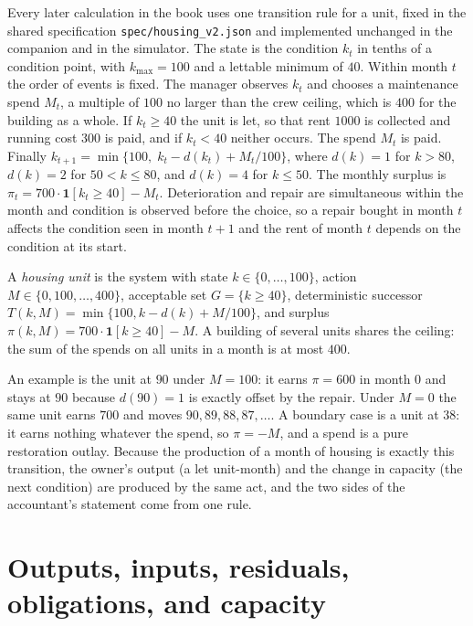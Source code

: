 Every later calculation in the book uses one transition rule for a unit, fixed in the shared specification \texttt{spec/housing\_v2.json} and implemented unchanged in the companion and in the simulator. The state is the condition $k_t$ in tenths of a condition point, with $k_{\max}=100$ and a lettable minimum of $40$. Within month $t$ the order of events is fixed. The manager observes $k_t$ and chooses a maintenance spend $M_t$, a multiple of $100$ no larger than the crew ceiling, which is $400$ for the building as a whole. If $k_t\ge 40$ the unit is let, so that rent $1000$ is collected and running cost $300$ is paid, and if $k_t<40$ neither occurs. The spend $M_t$ is paid. Finally $k_{t+1}=\min\{100,\;k_t-d(k_t)+M_t/100\}$, where $d(k)=1$ for $k>80$, $d(k)=2$ for $50<k\le 80$, and $d(k)=4$ for $k\le 50$. The monthly surplus is $\pi_t=700\cdot\mathbf 1[k_t\ge 40]-M_t$. Deterioration and repair are simultaneous within the month and condition is observed before the choice, so a repair bought in month $t$ affects the condition seen in month $t+1$ and the rent of month $t$ depends on the condition at its start.

\begin{definition}\label{def:housing-transition}
A \emph{housing unit} is the system with state $k\in\{0,\dots,100\}$, action $M\in\{0,100,\dots,400\}$, acceptable set $G=\{k\ge 40\}$, deterministic successor $T(k,M)=\min\{100,k-d(k)+M/100\}$, and surplus $\pi(k,M)=700\cdot\mathbf 1[k\ge 40]-M$. A building of several units shares the ceiling: the sum of the spends on all units in a month is at most $400$.
\end{definition}

An example is the unit at $90$ under $M=100$: it earns $\pi=600$ in month $0$ and stays at $90$ because $d(90)=1$ is exactly offset by the repair. Under $M=0$ the same unit earns $700$ and moves $90,89,88,87,\dots$. A boundary case is a unit at $38$: it earns nothing whatever the spend, so $\pi=-M$, and a spend is a pure restoration outlay. Because the production of a month of housing is exactly this transition, the owner's output (a let unit-month) and the change in capacity (the next condition) are produced by the same act, and the two sides of the accountant's statement come from one rule.

\section{Outputs, inputs, residuals, obligations, and capacity}

